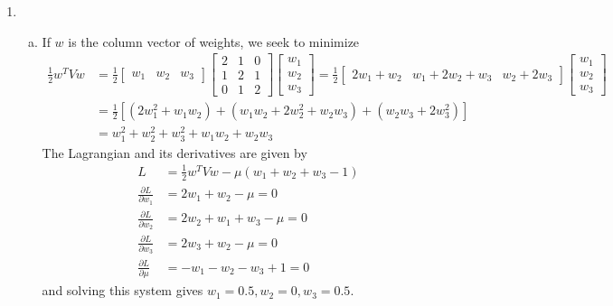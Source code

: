 \documentclass{article}
\begin{document}
\begin{enumerate}
	\item 
		\begin{enumerate}[(a)]
			\item
				\begin{soln}
					If $w$ is the column vector of weights, we seek to minimize
					\begin{align*}
						\frac{1}{2}w^T V w &= \frac{1}{2}\begin{bmatrix}
							w_1 & w_2 & w_3
						\end{bmatrix}\begin{bmatrix}
							2 & 1 & 0 \\
							1 & 2 & 1 \\
							0 & 1 & 2
						\end{bmatrix}
						\begin{bmatrix}
							w_1 \\ w_2 \\ w_3
						\end{bmatrix} = \frac{1}{2}\begin{bmatrix}
							2w_1+w_2 & w_1+2w_2+w_3 & w_2+2w_3
						\end{bmatrix} \begin{bmatrix}
							w_1 \\ w_2 \\ w_3
						\end{bmatrix} \\
						&=\frac{1}{2}\left[ (2w_1^2+w_1w_2)+(w_1w_2+2w_2^2+w_2w_3)+(w_2w_3+2w_3^2)\right] \\
						&= w_1^2+w_2^2+w_3^2 + w_1w_2 + w_2w_3
					\end{align*}
					The Lagrangian and its derivatives are given by
					\begin{align*}
						L &= \frac{1}{2}w^T Vw - \mu\left( w_1+w_2+w_3-1 \right) \\
						\frac{\partial L}{\partial w_1} &= 2w_1+w_2-\mu = 0 \\
						\frac{\partial L}{\partial w_2} &= 2w_2 + w_1+w_3 - \mu = 0 \\
						\frac{\partial L}{\partial w_3} &= 2w_3+w_2 - \mu = 0 \\
						\frac{\partial L}{\partial\mu} &= -w_1-w_2-w_3+1 = 0
					\end{align*}
					and solving this system gives $w_1=0.5, w_2=0, w_3=0.5.$
				\end{soln}


\end{enumerate}
\end{enumerate}
\end{document}
